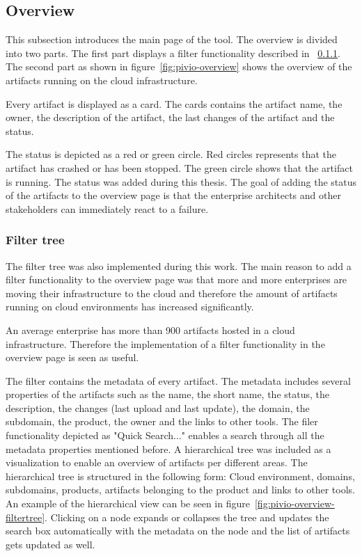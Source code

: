 \subsection{Overview}\label{subsection:overview}

This subsection introduces the main page of the tool. The overview is divided into two parts. The first part displays a filter functionality described in ~\ref{subsubsection:filtertree}. The second part as shown in figure~\ref{fig:pivio-overview} shows the overview of the artifacts running on the cloud infrastructure.

Every artifact is displayed as a card. The cards contains the artifact name, the owner, the description of the artifact, the last changes of the artifact and the status. 
 
The status is depicted as a red or green circle. Red circles represents that the artifact has crashed or has been stopped. The green circle shows that the artifact is running. The status was added during this thesis. The goal of adding the status of the artifacts to the overview page is that the enterprise architects and other stakeholders can immediately react to a failure.

\subsubsection{Filter tree}\label{subsubsection:filtertree}

The filter tree was also implemented during this work. The main reason to add a filter functionality to the overview page was that more and more enterprises are moving their infrastructure to the cloud and therefore the amount of artifacts running on cloud environments has increased significantly. \cite{Badger2012}

An average enterprise has more than 900 artifacts hosted in a cloud infrastructure. \cite{IsaacOdun-AyoFrankAgono2018} Therefore the implementation of a filter functionality in the overview page is seen as useful.

The filter contains the metadata of every artifact. The metadata includes several properties of the artifacts such as the name, the short name, the status, the description, the changes (last upload and last update), the domain, the subdomain, the product, the owner and the links to other tools. The filer functionality depicted as "Quick Search..." enables a search through all the metadata properties mentioned before.
A hierarchical tree was included as a visualization to enable an overview of artifacts per different areas. The hierarchical tree is structured in the following form: Cloud environment, domains, subdomains, products, artifacts belonging to the product and links to other tools. An example of the hierarchical view can be seen in figure~\ref{fig:pivio-overview-filtertree}. Clicking on a node expands or collapses the tree and updates the search box automatically with the metadata on the node and the list of artifacts gets updated as well.

